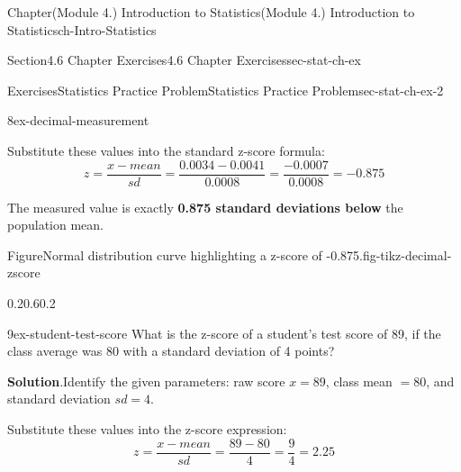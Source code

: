 \documentclass[oneside,10pt,]{book}
\newcommand{\blocktitlefont}{\relax}
\newcommand{\terminology}[1]{\textbf{#1}}
\begin{document}
\begin{chapterptx}{Chapter}{(Module 4.) Introduction to Statistics}{}{(Module 4.) Introduction to Statistics}{}{}{ch-Intro-Statistics}
\begin{sectionptx}{Section}{4.6 Chapter Exercises}{}{4.6 Chapter Exercises}{}{}{sec-stat-ch-ex}
\begin{exercises-subsection-numberless}{Exercises}{Statistics Practice Problem}{}{Statistics Practice Problem}{}{}{sec-stat-ch-ex-2}
\begin{divisionexercise}{8}{}{}{ex-decimal-measurement}
\par
Substitute these values into the standard z-score formula:%
\begin{equation*}
z = \frac{x - mean}{sd} = \frac{0.0034 - 0.0041}{0.0008} = \frac{-0.0007}{0.0008} = -0.875
\end{equation*}
%
\par
The measured value is exactly \terminology{0.875 standard deviations below} the population mean.%
\begin{figureptx}{Figure}{Normal distribution curve highlighting a z-score of -0.875.}{fig-tikz-decimal-zscore}{}%
\begin{image}{0.2}{0.6}{0.2}{}%
%
\end{image}%
\tcblower
\end{figureptx}%
\end{divisionexercise}%
\begin{divisionexercise}{9}{}{}{ex-student-test-score}%
What is the z-score of a student's test score of 89, if the class average was 80 with a standard deviation of 4 points?%
\par\smallskip%
\noindent\textbf{\blocktitlefont Solution}.\hypertarget{ex-student-test-score-2}{}\quad{}Identify the given parameters: raw score \(x = 89\), class mean \(= 80\), and standard deviation \(sd = 4\).%
\par
Substitute these values into the z-score expression:%
\begin{equation*}
z = \frac{x - mean}{sd} = \frac{89 - 80}{4} = \frac{9}{4} = 2.25
\end{equation*}

\end{divisionexercise}
\end{exercises-subsection-numberless}
\end{sectionptx}
\end{chapterptx}
\end{document}

